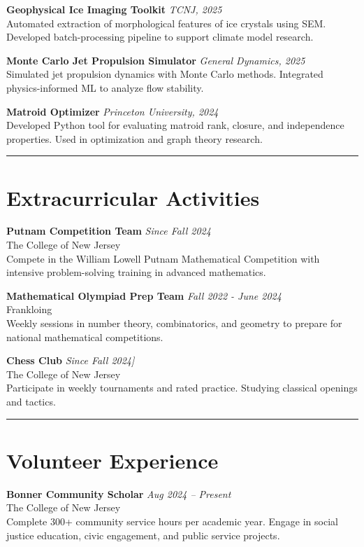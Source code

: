 \documentclass[a4paper,10pt]{article}
\newcommand{\sectionline}{\noindent\rule{\linewidth}{0.5mm}}
\begin{document}
\textbf{Geophysical Ice Imaging Toolkit} \hfill \textit{TCNJ, 2025} \\
Automated extraction of morphological features of ice crystals using SEM. Developed batch-processing pipeline to support climate model research.

\textbf{Monte Carlo Jet Propulsion Simulator} \hfill \textit{General Dynamics, 2025} \\
Simulated jet propulsion dynamics with Monte Carlo methods. Integrated physics-informed ML to analyze flow stability.

\textbf{Matroid Optimizer} \hfill \textit{Princeton University, 2024} \\
Developed Python tool for evaluating matroid rank, closure, and independence properties. Used in optimization and graph theory research.

\sectionline

\section*{Extracurricular Activities}
\textbf{Putnam Competition Team} \hfill \textit{Since Fall 2024} \\
The College of New Jersey \\
Compete in the William Lowell Putnam Mathematical Competition with intensive problem-solving training in advanced mathematics.

\textbf{Mathematical Olympiad Prep Team} \hfill \textit{ Fall 2022 - June 2024} \\
Frankloing  \\
Weekly sessions in number theory, combinatorics, and geometry to prepare for national mathematical competitions.

\textbf{Chess Club} \hfill \textit{Since Fall 2024]} \\
The College of New Jersey \\
Participate in weekly tournaments and rated practice. Studying classical openings and tactics.

\sectionline

\section*{Volunteer Experience}
\textbf{Bonner Community Scholar} \hfill \textit{Aug 2024 -- Present} \\
The College of New Jersey \\
Complete 300+ community service hours per academic year. Engage in social justice education, civic engagement, and public service projects.
\end{document}
